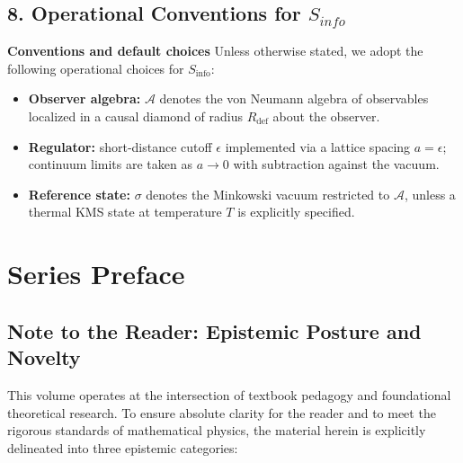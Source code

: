 \documentclass[12pt,openany]{book}
\theoremstyle{plain}
\theoremstyle{definition}
\theoremstyle{remark}
\begin{document}
\section*{8. Operational Conventions for $S_{info}$}

\textbf{Conventions and default choices}
Unless otherwise stated, we adopt the following operational choices for $S_{\mathrm{info}}$:
\begin{itemize}
  \item \textbf{Observer algebra:} $\mathcal{A}$ denotes the von Neumann algebra of observables localized in a causal diamond of radius $R_{\mathrm{def}}$ about the observer.
  \item \textbf{Regulator:} short‑distance cutoff $\epsilon$ implemented via a lattice spacing $a=\epsilon$; continuum limits are taken as $a\to 0$ with subtraction against the vacuum.
  \item \textbf{Reference state:} $\sigma$ denotes the Minkowski vacuum restricted to $\mathcal{A}$, unless a thermal KMS state at temperature $T$ is explicitly specified.
\end{itemize}

\chapter{Series Preface}

\section*{Note to the Reader: Epistemic Posture and Novelty}

This volume operates at the intersection of textbook pedagogy and foundational theoretical research. To ensure absolute clarity for the reader and to meet the rigorous standards of mathematical physics, the material herein is explicitly delineated into three epistemic categories:
\end{document}
